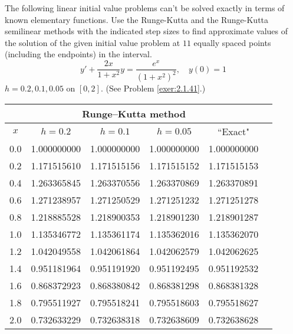 \documentclass{ximera}
\begin{document}
\begin{problem}\label{exer:3.3.18} The following linear initial value problems can't be solved exactly in terms of known elementary functions. Use the Runge-Kutta and the Runge-Kutta semilinear methods with the
indicated step sizes to find approximate values of the solution of the given initial value problem at $11$ equally spaced points (including the endpoints) in the interval.
$$y'+\frac{2x}{1+x^2}y=\frac{e^x}{(1+x^2)^2}, \quad y(0)=1$$
$h=0.2,0.1,0.05$ on $[0,2]$.
 (See Problem \ref{exer:2.1.41}.)

 \begin{solution}
     {\small
\begin{tabular}{|c|r|r|r|r|r|}
\hline
\multicolumn{5}{|c|}{Runge--Kutta method}\\\hline
\multicolumn{1}{|c|}{$x$}&
\multicolumn{1}{|c|}{$h=0.2$}&
\multicolumn{1}{|c|}{$h=0.1$}&
\multicolumn{1}{|c|}{$h=0.05$}&
\multicolumn{1}{|c|}{``Exact"}\\ \hline
0.0 & 1.000000000 & 1.000000000 & 1.000000000 & 1.000000000 \\
0.2 & 1.171515610 & 1.171515156 & 1.171515152 & 1.171515153 \\
0.4 & 1.263365845 & 1.263370556 & 1.263370869 & 1.263370891 \\
0.6 & 1.271238957 & 1.271250529 & 1.271251232 & 1.271251278 \\
0.8 & 1.218885528 & 1.218900353 & 1.218901230 & 1.218901287 \\
1.0 & 1.135346772 & 1.135361174 & 1.135362016 & 1.135362070 \\
1.2 & 1.042049558 & 1.042061864 & 1.042062579 & 1.042062625 \\
1.4 & 0.951181964 & 0.951191920 & 0.951192495 & 0.951192532 \\
1.6 & 0.868372923 & 0.868380842 & 0.868381298 & 0.868381328 \\
1.8 & 0.795511927 & 0.795518241 & 0.795518603 & 0.795518627 \\
2.0 & 0.732633229 & 0.732638318 & 0.732638609 & 0.732638628 \\
\hline
\end{tabular}}


\end{solution}
\end{problem}
\end{document}
